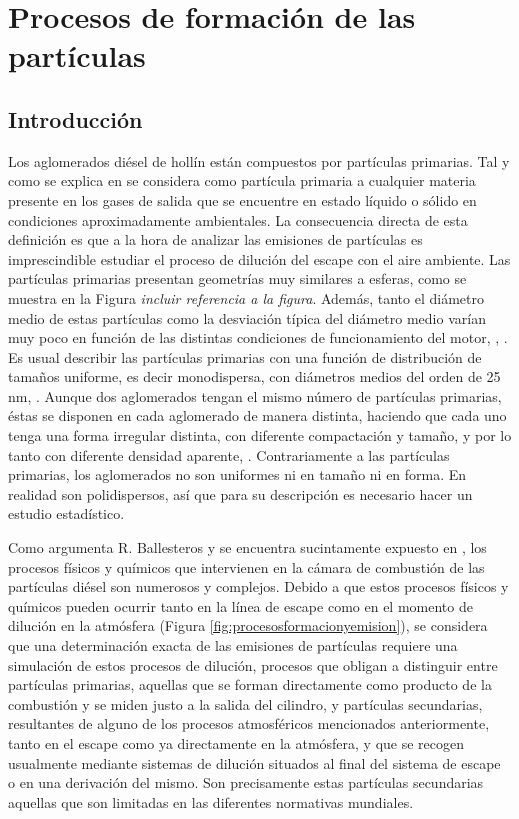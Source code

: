 \section{Procesos de formación de las partículas}
\subsection{Introducción}

\par Los aglomerados diésel de hollín están compuestos por partículas primarias. Tal y como se explica en \cite{varios:2011} se considera  como partícula primaria a cualquier materia presente en los gases de salida que se encuentre en estado líquido o sólido en condiciones aproximadamente ambientales. La consecuencia directa de esta definición es que a la hora de analizar las emisiones de partículas es imprescindible estudiar el proceso de dilución del escape con el aire ambiente. Las partículas primarias presentan geometrías muy similares a esferas, como se muestra en la Figura \textit{incluir referencia a la figura}. Además, tanto el diámetro medio de estas partículas como la desviación típica del diámetro medio varían muy poco en función de las distintas condiciones de funcionamiento del motor, \cite{leeetal2:2002}, \cite{zhuetal:2003}.  Es usual describir las partículas primarias con una función de distribución de tamaños uniforme, es decir monodispersa, con diámetros medios del orden de 25 nm, \cite{smallwoodetal:2002, wentzeletal:2003}. Aunque dos aglomerados tengan el mismo número de partículas primarias, éstas se disponen en cada aglomerado de manera distinta, haciendo que cada uno tenga una forma irregular distinta, con diferente compactación y tamaño, y por lo tanto con diferente densidad aparente, \cite{lapuertaetal:2003}. Contrariamente a las partículas primarias, los aglomerados no son uniformes ni en tamaño ni en forma. En realidad son polidispersos, así que para su descripción es necesario hacer un estudio estadístico.

\par Como argumenta R. Ballesteros \cite{chariphD:2002} y se encuentra sucintamente expuesto en \cite{varios:2011}, los procesos físicos y químicos que intervienen en la cámara de combustión de las partículas diésel son numerosos y complejos. Debido a que estos procesos físicos y químicos pueden ocurrir tanto en la línea de escape como en el momento de dilución en la atmósfera (Figura \ref{fig:procesosformacionyemision}), se considera que una determinación exacta de las emisiones de partículas requiere una simulación de estos procesos de dilución, procesos que obligan a distinguir entre  partículas primarias, aquellas que se forman directamente como producto de la combustión y se miden justo a la salida del cilindro, y  partículas secundarias, resultantes de alguno de los procesos atmosféricos mencionados anteriormente, tanto en el escape como ya directamente en la atmósfera, y que se recogen usualmente mediante sistemas de dilución situados al final del sistema de escape o en una derivación del mismo. Son precisamente estas partículas secundarias aquellas que son limitadas en las diferentes normativas mundiales.

